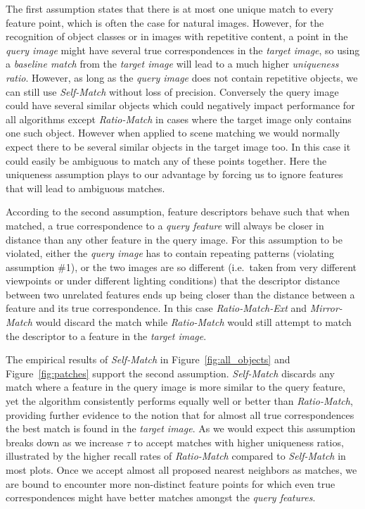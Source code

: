 \documentclass[review]{elsarticle}
\begin{document}
The first assumption states that there is at most one unique match to every feature point, which is often the case for natural images. However, for the recognition of object classes or in images with repetitive content, a point in the \emph{query image} might have several true correspondences in the \emph{target image}, so using a \emph{baseline match} from the \emph{target image} will lead to a much higher \emph{uniqueness ratio}. However, as long as the \emph{query image} does not contain repetitive objects, we can still use \emph{Self-Match} without loss of precision. Conversely the query image could have several similar objects which could negatively impact performance for all algorithms except \emph{Ratio-Match} in cases where the target image only contains one such object. However when applied to scene matching we would normally expect there to be several similar objects in the target image too. In this case it could easily be ambiguous to match any of these points together. Here the uniqueness assumption plays to our advantage by forcing us to ignore features that will lead to ambiguous matches.

According to the second assumption, feature descriptors behave such that when matched, a true correspondence to a \emph{query feature} will always be closer in distance than any other feature in the query image. For this assumption to be violated, either the \emph{query image} has to contain repeating patterns (violating assumption \#1), or the two images are so different (i.e.\ taken from very different viewpoints or under different lighting conditions) that the descriptor distance between two unrelated features ends up being closer than the distance between a feature and its true correspondence. In this case \emph{Ratio-Match-Ext} and \emph{Mirror-Match} would discard the match while \emph{Ratio-Match} would still attempt to match the descriptor to a feature in the \emph{target image}. 

The empirical results of \emph{Self-Match} in Figure~\ref{fig:all_objects} and Figure~\ref{fig:patches} support the second assumption. \emph{Self-Match} discards any match where a feature in the query image is more similar to the query feature, yet the algorithm consistently performs equally well or better than \emph{Ratio-Match}, providing further evidence to the notion that for almost all true correspondences the best match is found in the \emph{target image}. As we would expect this assumption breaks down as we increase $\tau$ to accept matches with higher uniqueness ratios, illustrated by the higher recall rates of \emph{Ratio-Match} compared to \emph{Self-Match} in most plots. Once we accept almost all proposed nearest neighbors as matches, we are bound to encounter more non-distinct feature points for which even true correspondences might have better matches amongst the \emph{query features}.
\end{document}
